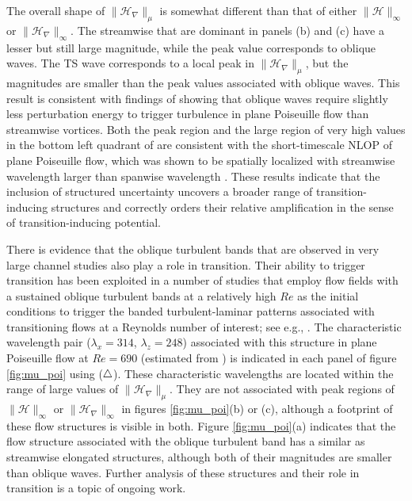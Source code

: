 The overall shape of $\|\mathcal{H}_\nabla\|_\mu$ is somewhat different than that of either $\|\mathcal{H}\|_\infty$ or $\|\mathcal{H}_\nabla\|_\infty$. The streamwise  that are dominant in panels (b) and (c) have a lesser but still large magnitude, while the peak value corresponds to oblique waves. The TS wave corresponds to a local peak in $\|\mathcal{H}_{\nabla}\|_{\mu}$, but the magnitudes are smaller than the peak values associated with oblique waves. This result is consistent with findings of \citet[figure 19]{reddy1998stability}  showing that oblique waves require slightly less perturbation energy to trigger turbulence in plane Poiseuille flow than streamwise vortices. Both the peak region and the large region of very high values in the bottom left quadrant of  are consistent with the short-timescale NLOP of plane Poiseuille flow, which was shown to be spatially localized with streamwise wavelength larger than spanwise wavelength \citep{farano2015hairpin}. \iffalse \rev{The peak region in figure \ref{fig:mu_poi}(a) also resembles quasi-streamwise flow structures ($\lambda_x\gg \lambda_z$ and $k_x\neq 0$) observed in transitional regime; see e.g., \citep{tsukahara2005dns}.}\fi These results indicate that the inclusion of structured uncertainty uncovers a broader range of transition-inducing structures and correctly orders their relative amplification in the sense of  transition-inducing potential.    



There is evidence that the oblique turbulent bands that are observed in very large channel studies also play a role in transition. Their ability to trigger transition has been exploited in a number of studies that employ flow  fields with  a sustained  oblique turbulent bands at a relatively high $Re$ as the initial conditions to trigger the banded turbulent-laminar patterns associated with transitioning flows at a Reynolds number of interest; see e.g., \citep{tsukahara2005dns,tuckerman2014turbulent,tao2018extended,xiao2020growth}. The characteristic wavelength pair ($\lambda_x=314$,  $\lambda_z=248$) associated with this structure  in plane Poiseuille flow at $Re=690$ (estimated from \citet[figure 5.1(b)]{kanazawa2018lifetime}) is indicated in each panel of figure \ref{fig:mu_poi} using ({\color{black}$\hspace{-0.0070in}\vspace{-0.015in}\triangle$}). These characteristic wavelengths are located within the range of large values of $\|\mathcal{H}_{\nabla}\|_\mu$. They are not associated with peak regions of  $\|\mathcal{H}\|_\infty$ or $\|\mathcal{H}_\nabla\|_\infty$ in figures \ref{fig:mu_poi}(b) or (c), although a footprint of these flow structures is visible in both. Figure \ref{fig:mu_poi}(a) indicates that the flow structure associated with the oblique turbulent band has a similar  as streamwise elongated structures, although both of their magnitudes are smaller than  oblique waves. Further analysis of these structures and their role in transition is a topic of ongoing work.



